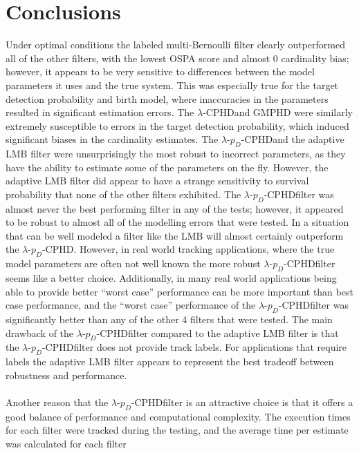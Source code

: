 \documentclass{article}
\newcommand{\lcphd}{$\lambda$-CPHD}
\newcommand{\lpdcphd}{$\lambda$-$p_D$-CPHD}
\begin{document}
\section{Conclusions}
Under optimal conditions the labeled multi-Bernoulli filter clearly outperformed all of the other filters, with the lowest OSPA score and almost 0 cardinality bias; however, it appears to be very sensitive to differences between the model parameters it uses and the true system. This was especially true for the target detection probability and birth model, where inaccuracies in the parameters resulted in significant estimation errors. The \lcphd and GMPHD were similarly extremely susceptible to errors in the target detection probability, which induced significant biases in the cardinality estimates. The \lpdcphd and the adaptive LMB filter were unsurprisingly the most robust to incorrect parameters, as they have the ability to estimate some of the parameters on the fly. However, the adaptive LMB filter did appear to have a strange sensitivity to survival probability that none of the other filters exhibited. The \lpdcphd filter was almost never the best performing filter in any of the tests; however, it appeared to be robust to almost all of the modelling errors that were tested. In a situation that can be well modeled a filter like the LMB will almost certainly outperform the \lpdcphd. However, in real world tracking applications, where the true model parameters are often not well known the more robust \lpdcphd filter seems like a better choice. Additionally, in many  real world applications being able to provide better ``worst case'' performance can be more important than best case performance, and the ``worst case'' performance of the \lpdcphd filter was significantly better than any of the other 4 filters that were tested. The main drawback of the \lpdcphd filter compared to the adaptive LMB filter is that the \lpdcphd filter does not provide track labels. For applications that require labels the adaptive LMB filter appears to represent the best tradeoff between robustness and performance.\\
\\
Another reason that the \lpdcphd filter is an attractive choice is that it offers a good balance of performance and computational complexity. The execution times for each filter were tracked during the testing, and the average time per estimate was calculated for each filter
\end{document}
